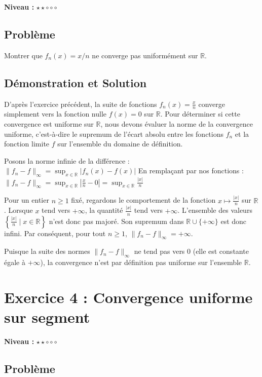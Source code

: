 \documentclass{report}
\begin{document}
\textbf{Niveau :} $\star \star \circ \circ \circ $

\section*{Problème}

Montrer que $f_n(x) = x/n$ ne converge pas uniformément sur $\mathbb{R}$.

\section*{Démonstration et Solution}

D'après l'exercice précédent, la suite de fonctions $f_n(x) = \frac{x}{n}$ converge simplement vers la fonction nulle $f(x) = 0$ sur $\mathbb{R}$.
Pour déterminer si cette convergence est uniforme sur $\mathbb{R}$, nous devons évaluer la norme de la convergence uniforme, c'est-à-dire le supremum de l'écart absolu entre les fonctions $f_n$ et la fonction limite $f$ sur l'ensemble du domaine de définition.

Posons la norme infinie de la différence :
$\|f_n - f\|_\infty = \sup_{x \in \mathbb{R}} |f_n(x) - f(x)|$
En remplaçant par nos fonctions :
$\|f_n - f\|_\infty = \sup_{x \in \mathbb{R}} \left| \frac{x}{n} - 0 \right| = \sup_{x \in \mathbb{R}} \frac{|x|}{n}$

Pour un entier $n \geq 1$ fixé, regardons le comportement de la fonction $x \mapsto \frac{|x|}{n}$ sur $\mathbb{R}$.
Lorsque $x$ tend vers $+\infty$, la quantité $\frac{|x|}{n}$ tend vers $+\infty$.
L'ensemble des valeurs $\left\{ \frac{|x|}{n} \mid x \in \mathbb{R} \right\}$ n'est donc pas majoré. Son supremum dans $\mathbb{R} \cup \{+\infty\}$ est donc infini.
Par conséquent, pour tout $n \geq 1$, $\|f_n - f\|_\infty = +\infty$.

Puisque la suite des normes $\|f_n - f\|_\infty$ ne tend pas vers 0 (elle est constante égale à $+\infty$), la convergence n'est par définition pas uniforme sur l'ensemble $\mathbb{R}$.

\newpage


\chapter*{Exercice 4 : Convergence uniforme sur segment}

\textbf{Niveau :} $\star \star \circ \circ \circ $

\section*{Problème}
\end{document}
